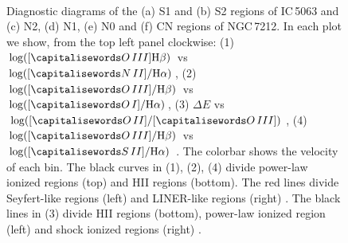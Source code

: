 \documentclass[../thesis.tex]{subfiles}
\begin{document}
\begin{figure}
\\
\caption[]{Diagnostic diagrams of the (a) S1 and (b) S2 regions of IC\,5063 and (c) N2, (d) N1, (e) N0 and (f) CN  regions of NGC\,7212.  In each plot we show, from the top left panel clockwise: (1) $\log([\ion{O}{III}] \Hb)$ vs $\log([\ion{N}{II}]/ \Ha)$, (2) $\log([\ion{O}{III}]/ \Hb)$ vs $\log([\ion{O}{I}]/ \Ha)$, (3) $\Delta E$ vs $\log([\ion{O}{II}]/[\ion{O}{III}])$, (4) $\log([\ion{O}{III}]/ \Hb)$ vs $\log([\ion{S}{II}]/ \Ha)$ \citep{Baldwin81, Veilleux87}. The colorbar shows the velocity of each bin. The black curves in (1), (2), (4) divide power-law ionized regions (top) and HII regions (bottom). The red lines divide Seyfert-like regions (left) and LINER-like regions (right) \citep{Kewley06}. The black lines in (3) divide HII regions (bottom), power-law ionized region (left) and shock ionized regions (right) \citep{Baldwin81}.   }
\label{fig:diag_n0cnN}
\end{figure}
\end{document}
